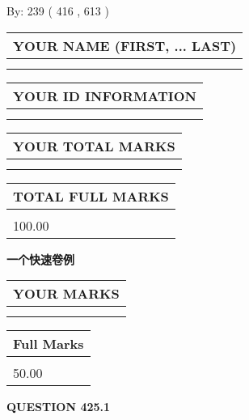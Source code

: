 \documentclass{ctexart}
\begin{document}
   
\hspace{1.0in} By: 
 239 ( 416 ,  613 )
   
   
   
   
\newpage 
\setcounter{page}{ 
   425001 } 
   
   
   
   
\noindent\begin{tabular}{|l|}
\hline
YOUR NAME (FIRST, ... LAST)  \\
\hline
 \\ 
 \\ 
\hline
\end{tabular}
\hspace{0.05in} \begin{tabular}{|l|}
\hline
 YOUR   ID   INFORMATION  \\
\hline
 \\ 
 \\ 
\hline
\end{tabular}
   
   
\vspace{0.2in}\noindent\begin{tabular}{|l|}
\hline
YOUR TOTAL MARKS  \\
\hline
 \\ 
 \\ 
\hline
\end{tabular}
\hspace{0.05in} \begin{tabular}{|l|}
\hline
TOTAL FULL MARKS  \\
\hline
 \\ 
100.00 \\
\hline
\end{tabular}
   
   
 \vspace{0.2in}
{\LARGE {\textbf{ 一个快速卷例}}}
   
   
  
\vspace{0.2in}
  
\noindent\begin{tabular}{|l|}
\hline
 YOUR MARKS  \\
\hline
 \\ 
 \\ 
\hline
\end{tabular}
\hspace{0.05in} \begin{tabular}{|l|}
\hline
 Full Marks  \\
\hline
 \\ 
50.00 \\
\hline
\end{tabular}
{\textbf{\Large{QUESTION
425.1 
}}}
  
\end{document}
